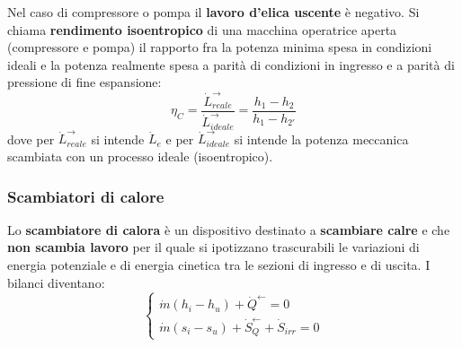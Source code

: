 \begin{itemize}
    \newline
    Nel caso di compressore o pompa il \textbf{lavoro d'elica uscente} è negativo.\newline
    \newline
    Si chiama \textbf{rendimento isoentropico} di una macchina operatrice aperta (compressore e pompa) il rapporto fra la potenza minima spesa in condizioni ideali e la potenza realmente spesa a parità di condizioni in ingresso e a parità di pressione di fine espansione:
    \[
        \eta_C = \frac{\dot{L}_{reale}^\rightarrow }{\dot{L}_{ideale}^\rightarrow } = \frac{h_1-h_2}{h_1-h_{2'}} 
    \]
    dove per $\dot{L}_{reale}^\rightarrow $ si intende $\dot{L}_e$ e per $\dot{L}_{ideale}^\rightarrow $ si intende la potenza meccanica scambiata con un processo ideale (isoentropico).
\end{itemize}
\subsubsection{Scambiatori di calore}
Lo \textbf{scambiatore di calora} è un dispositivo destinato a \textbf{scambiare calre} e che \textbf{non scambia lavoro} per il quale si ipotizzano trascurabili le variazioni di energia potenziale e di energia cinetica tra le sezioni di ingresso e di uscita.\newline
\newline
I bilanci diventano:
\[
    \begin{cases}
        \dot{m}(h_i - h_u) + \dot{Q}^\leftarrow  = 0\\
        \dot{m}(s_i-s_u) + \dot{S}_{Q}^\leftarrow + \dot{S}_{irr} =0 
    \end{cases}
\]

